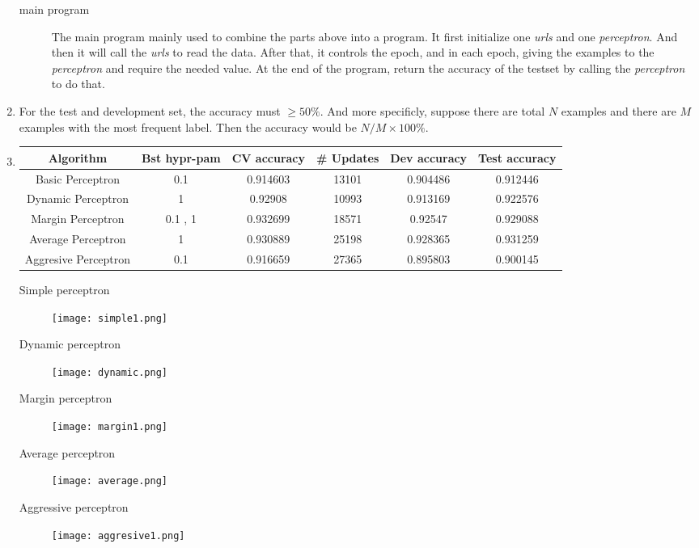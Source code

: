 \documentclass{article}
\begin{document}
\begin{enumerate}
\begin{description}
			\item[main program] The main program mainly used to combine the parts above into a program. It first initialize one \emph{urls} and one \emph{perceptron}. And then it will call the \emph{urls} to read the data. After that, it controls the epoch, and in each epoch, giving the examples to the \emph{perceptron} and require the needed value. At the end of the program, return the accuracy of the testset by calling the \emph{perceptron} to do that.
		\end{description}
		\item For the test and development set, the accuracy must $\geq 50\%$. And more specificly, suppose there are total $N$ examples and there are $M$ examples with the most frequent label. Then the accuracy would be $N / M \times 100\%$.
		\item \begin{tabular}{|c|c|c|c|c|c|}
		\hline
			Algorithm & Bst hypr-pam & CV accuracy & \# Updates & Dev accuracy & Test accuracy \\
		\hline
			Basic Perceptron & 0.1 & 0.914603 & 13101 & 0.904486 & 0.912446\\
		\hline
			Dynamic Perceptron & 1 & 0.92908 & 10993 & 0.913169 & 0.922576\\
		\hline
			Margin Perceptron & 0.1 , 1& 0.932699 & 18571 & 0.92547 & 0.929088\\
		\hline 
			Average Perceptron & 1 & 0.930889 & 25198 & 0.928365 & 0.931259 \\
		\hline
			Aggresive Perceptron & 0.1  & 0.916659 & 27365 & 0.895803 & 0.900145\\
		\hline
		\end{tabular}
		\begin{description}
			\item[Simple perceptron]
				\texttt{[image: simple1.png]}
			\item[Dynamic perceptron]
				\texttt{[image: dynamic.png]}
			\item[Margin perceptron]
				\texttt{[image: margin1.png]}
			\item[Average perceptron]
				\texttt{[image: average.png]}
			\item[Aggressive perceptron]
				\texttt{[image: aggresive1.png]}
		\end{description}
	\end{enumerate}
\end{document}
